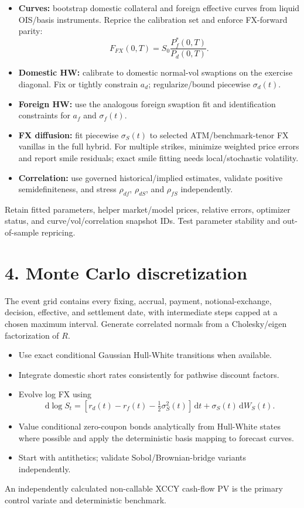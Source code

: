 \documentclass[9pt,letterpaper]{extarticle}
\newcommand{\dd}{\,\mathrm{d}}
\begin{document}
\begin{itemize}
  \item \textbf{Curves:} bootstrap domestic collateral and foreign effective curves from liquid OIS/basis instruments. Reprice the calibration set and enforce FX-forward parity:
  \[
    F_{FX}(0,T)=S_0\frac{P_f^{*}(0,T)}{P_d(0,T)}.
  \]
  \item \textbf{Domestic HW:} calibrate to domestic normal-vol swaptions on the exercise diagonal. Fix or tightly constrain $a_d$; regularize/bound piecewise $\sigma_d(t)$.
  \item \textbf{Foreign HW:} use the analogous foreign swaption fit and identification constraints for $a_f$ and $\sigma_f(t)$.
  \item \textbf{FX diffusion:} fit piecewise $\sigma_S(t)$ to selected ATM/benchmark-tenor FX vanillas in the full hybrid. For multiple strikes, minimize weighted price errors and report smile residuals; exact smile fitting needs local/stochastic volatility.
  \item \textbf{Correlation:} use governed historical/implied estimates, validate positive semidefiniteness, and stress $\rho_{df}$, $\rho_{dS}$, and $\rho_{fS}$ independently.
\end{itemize}
Retain fitted parameters, helper market/model prices, relative errors, optimizer status, and curve/vol/correlation snapshot IDs. Test parameter stability and out-of-sample repricing.

\section{4. Monte Carlo discretization}

The event grid contains every fixing, accrual, payment, notional-exchange, decision, effective, and settlement date, with intermediate steps capped at a chosen maximum interval. Generate correlated normals from a Cholesky/eigen factorization of $R$.
\begin{itemize}
  \item Use exact conditional Gaussian Hull-White transitions when available.
  \item Integrate domestic short rates consistently for pathwise discount factors.
  \item Evolve log FX using
  \[
    \dd\log S_t=\left[r_d(t)-r_f(t)-\tfrac12\sigma_S^2(t)\right]\dd t+\sigma_S(t)\dd W_S(t).
  \]
  \item Value conditional zero-coupon bonds analytically from Hull-White states where possible and apply the deterministic basis mapping to forecast curves.
  \item Start with antithetics; validate Sobol/Brownian-bridge variants independently.
\end{itemize}
An independently calculated non-callable XCCY cash-flow PV is the primary control variate and deterministic benchmark.
\end{document}
